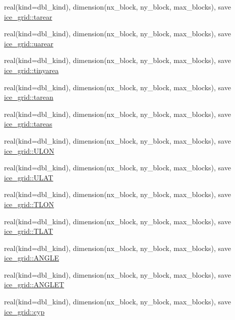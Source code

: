 \begin{DoxyCompactItemize}
\item 
real(kind=dbl\_\-kind), dimension(nx\_\-block, ny\_\-block, max\_\-blocks), save \hyperlink{namespaceice__grid_ab853acbf3fa50d832ffed201f760ef88}{ice\_\-grid::tarear}
\item 
real(kind=dbl\_\-kind), dimension(nx\_\-block, ny\_\-block, max\_\-blocks), save \hyperlink{namespaceice__grid_acf709799675ca52c31d335eb09a46fcf}{ice\_\-grid::uarear}
\item 
real(kind=dbl\_\-kind), dimension(nx\_\-block, ny\_\-block, max\_\-blocks), save \hyperlink{namespaceice__grid_a24fc3cf53e5e2c356bd8e4110112f39c}{ice\_\-grid::tinyarea}
\item 
real(kind=dbl\_\-kind), dimension(nx\_\-block, ny\_\-block, max\_\-blocks), save \hyperlink{namespaceice__grid_a233932d1edd125ed1e3c0cc7b990f256}{ice\_\-grid::tarean}
\item 
real(kind=dbl\_\-kind), dimension(nx\_\-block, ny\_\-block, max\_\-blocks), save \hyperlink{namespaceice__grid_ad08766f36b378acddead7f3503d7be19}{ice\_\-grid::tareas}
\item 
real(kind=dbl\_\-kind), dimension(nx\_\-block, ny\_\-block, max\_\-blocks), save \hyperlink{namespaceice__grid_a15766c63c75fd52d6d8ea3d651ecba26}{ice\_\-grid::ULON}
\item 
real(kind=dbl\_\-kind), dimension(nx\_\-block, ny\_\-block, max\_\-blocks), save \hyperlink{namespaceice__grid_a98cabaeec38bbcfe0d2844d8dae12434}{ice\_\-grid::ULAT}
\item 
real(kind=dbl\_\-kind), dimension(nx\_\-block, ny\_\-block, max\_\-blocks), save \hyperlink{namespaceice__grid_a2b90fd0fa35a54c0313dac995f929ee7}{ice\_\-grid::TLON}
\item 
real(kind=dbl\_\-kind), dimension(nx\_\-block, ny\_\-block, max\_\-blocks), save \hyperlink{namespaceice__grid_a76fff4cfe2a27c44abe9fd445f806f25}{ice\_\-grid::TLAT}
\item 
real(kind=dbl\_\-kind), dimension(nx\_\-block, ny\_\-block, max\_\-blocks), save \hyperlink{namespaceice__grid_a0a538e97fcd87790e7fae5de82bd0e77}{ice\_\-grid::ANGLE}
\item 
real(kind=dbl\_\-kind), dimension(nx\_\-block, ny\_\-block, max\_\-blocks), save \hyperlink{namespaceice__grid_aa8fc09d102ada560318d68276c1dfd57}{ice\_\-grid::ANGLET}
\item 
real(kind=dbl\_\-kind), dimension(nx\_\-block, ny\_\-block, max\_\-blocks), save \hyperlink{namespaceice__grid_a30e2151554a97e140124f4cb4317a054}{ice\_\-grid::cyp}
\item 

\end{DoxyCompactItemize}
